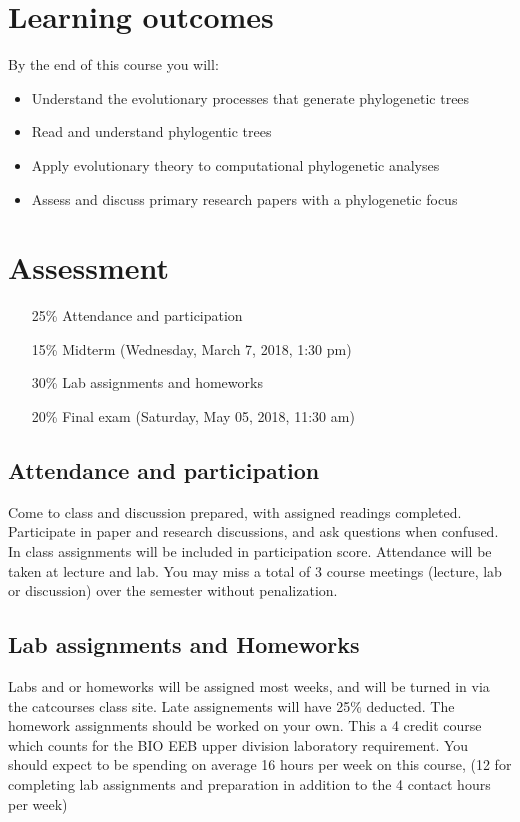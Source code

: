 \documentclass{article}
\begin{document}
\section*{Learning outcomes}
By the end of this course you will:
\begin{itemize}
 \item Understand the evolutionary processes that generate phylogenetic trees
 \item Read and understand phylogentic trees
 \item Apply evolutionary theory to computational phylogenetic analyses
 \item Assess and discuss primary research papers with a phylogenetic focus
\end{itemize}

\section*{Assessment}
\begin{itemize}
 \item[25\%] Attendance and participation
 \item[15\%] Midterm (Wednesday, March 7, 2018, 1:30 pm)
 \item[30\%] Lab assignments and homeworks
 \item[20\%] Final exam (Saturday, May 05, 2018, 11:30 am)
\end{itemize}

\subsection*{Attendance and participation}
Come to class and discussion prepared, with assigned readings completed.
Participate in paper and research discussions, and ask questions when confused.
In class assignments will be included in participation score.
Attendance will be taken at lecture and lab. 
You may miss a total of 3 course meetings (lecture, lab or discussion) over the semester without penalization.

\subsection*{Lab assignments and Homeworks}
Labs and or homeworks will be assigned most weeks, and will be turned in via the catcourses class site. Late assignements will have 25\% deducted.
The homework assignments should be worked on your own.
This a 4 credit course which counts for the BIO EEB upper division laboratory requirement. 
You should expect to be spending on average 16 hours per week on this course, (12 for completing lab assignments and preparation in addition to the 4 contact hours per week)
\end{document}
